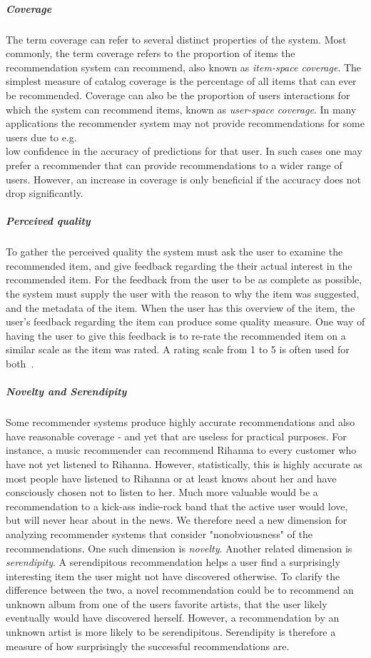 \subparagraph{Coverage}
The term coverage can refer to several distinct properties of the system. Most
commonly, the term coverage refers to the proportion of items the
recommendation system can recommend, also known as \emph{item-space coverage}.
The simplest measure of catalog coverage is the percentage of all items that
can ever be recommended. Coverage can also be the proportion of users
interactions for which the system can recommend items, known as
\emph{user-space coverage}. In many applications the recommender system may not
provide recommendations for some users due to e.g.\\ low confidence in the
accuracy of predictions for that user. In such cases one may prefer a
recommender that can provide recommendations to a wider range of users. However, an increase in coverage is only beneficial if the accuracy does not drop significantly.

\subparagraph{Perceived quality}
To gather the perceived quality the system must ask the user to examine the recommended item, and give feedback regarding the their actual interest in the recommended item.
For the feedback from the user to be as complete as possible, the system must supply the user with the reason to why the item was suggested, and the metadata of the item.
When the user has this overview of the item, the user's feedback regarding the item can produce some quality measure.
One  way of having the user to give this feedback is to re-rate the recommended item on a similar scale as the item was rated.
A rating scale from 1 to 5 is often used for both~\cite{Schafer:1999:RSE:336992.337035}.

\subparagraph{Novelty and Serendipity}
Some recommender systems produce highly accurate recommendations and also have reasonable coverage - and yet that are useless for practical purposes. For instance, a music recommender can recommend Rihanna to every customer who have not yet listened to Rihanna. However, statistically, this is highly accurate as most people have listened to Rihanna or at least knows about her and have consciously chosen not to listen to her. Much more valuable would be a recommendation to a kick-ass indie-rock band that the active user would love, but will never hear about in the news. We therefore need a new dimension for analyzing recommender systems that consider "nonobviousness" of the recommendations. One such dimension is \emph{novelty}. Another related dimension is \emph{serendipity}. A serendipitous recommendation helps a user find a surprisingly interesting item the user might not have discovered otherwise. To clarify the difference between the two, a novel recommendation could be to recommend an unknown album from one of the users favorite artists, that the user likely eventually would have discovered herself. However, a recommendation by an unknown artist is more likely to be serendipitous. Serendipity is therefore a measure of how surprisingly the successful recommendations are.

